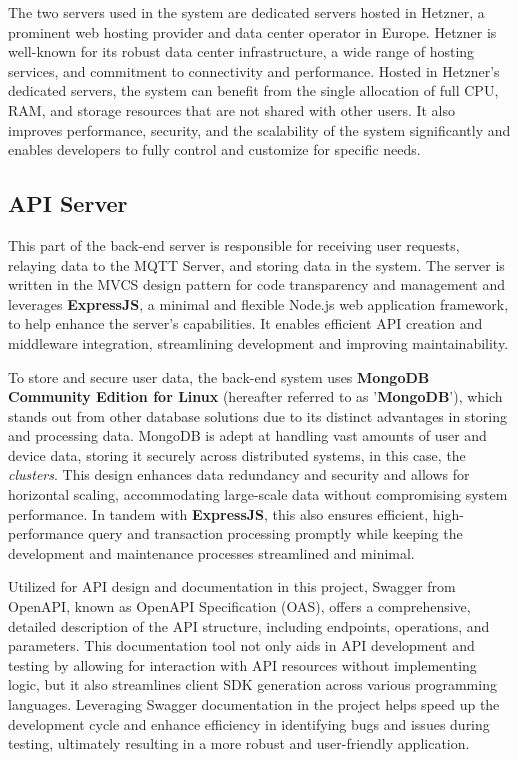 \documentclass[../Main.tex]{subfiles}
\begin{document}
The two servers used in the system are dedicated servers hosted in Hetzner, a prominent web hosting provider and data center operator in Europe. Hetzner is well-known for its robust data center infrastructure, a wide range of hosting services, and commitment to connectivity and performance. Hosted in Hetzner's dedicated servers, the system can benefit from the single allocation of full CPU, RAM, and storage resources that are not shared with other users. It also improves performance, security, and the scalability of the system significantly and enables developers to fully control and customize for specific needs.

\subsection{API Server}
This part of the back-end server is responsible for receiving user requests, relaying data to the MQTT Server, and storing data in the system. The server is written in the MVCS design pattern for code transparency and management and leverages \textbf{ExpressJS}, a minimal and flexible Node.js web application framework, to help enhance the server's capabilities. It enables efficient API creation and middleware integration, streamlining development and improving maintainability. 

To store and secure user data, the back-end system uses \textbf{MongoDB Community Edition for Linux} (hereafter referred to as '\textbf{MongoDB}'), which stands out from other database solutions due to its distinct advantages in storing and processing data. MongoDB is adept at handling vast amounts of user and device data, storing it securely across distributed systems, in this case, the \textit{clusters}. This design enhances data redundancy and security and allows for horizontal scaling, accommodating large-scale data without compromising system performance. In tandem with \textbf{ExpressJS}, this also ensures efficient, high-performance query and transaction processing promptly while keeping the development and maintenance processes streamlined and minimal.

Utilized for API design and documentation in this project, Swagger from OpenAPI, known as OpenAPI Specification (OAS), offers a comprehensive, detailed description of the API structure, including endpoints, operations, and parameters. This documentation tool not only aids in API development and testing by allowing for interaction with API resources without implementing logic, but it also streamlines client SDK generation across various programming languages. Leveraging Swagger documentation in the project helps speed up the development cycle and enhance efficiency in identifying bugs and issues during testing, ultimately resulting in a more robust and user-friendly application.
\end{document}
